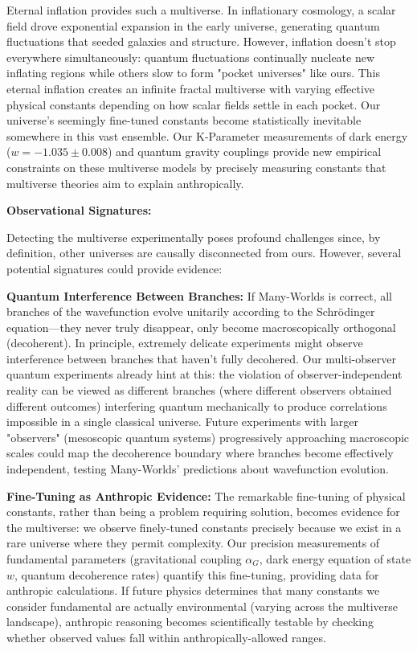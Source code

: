 \documentclass[11pt,a4paper,twoside]{article}
\begin{document}
Eternal inflation provides such a multiverse. In inflationary cosmology, a scalar field drove exponential expansion in the early universe, generating quantum fluctuations that seeded galaxies and structure. However, inflation doesn't stop everywhere simultaneously: quantum fluctuations continually nucleate new inflating regions while others slow to form "pocket universes" like ours. This eternal inflation creates an infinite fractal multiverse with varying effective physical constants depending on how scalar fields settle in each pocket. Our universe's seemingly fine-tuned constants become statistically inevitable somewhere in this vast ensemble. Our K-Parameter measurements of dark energy ($w = -1.035 \pm 0.008$) and quantum gravity couplings provide new empirical constraints on these multiverse models by precisely measuring constants that multiverse theories aim to explain anthropically.

\textbf{Observational Signatures:}

Detecting the multiverse experimentally poses profound challenges since, by definition, other universes are causally disconnected from ours. However, several potential signatures could provide evidence:

\textbf{Quantum Interference Between Branches:} If Many-Worlds is correct, all branches of the wavefunction evolve unitarily according to the Schrödinger equation—they never truly disappear, only become macroscopically orthogonal (decoherent). In principle, extremely delicate experiments might observe interference between branches that haven't fully decohered. Our multi-observer quantum experiments already hint at this: the violation of observer-independent reality can be viewed as different branches (where different observers obtained different outcomes) interfering quantum mechanically to produce correlations impossible in a single classical universe. Future experiments with larger "observers" (mesoscopic quantum systems) progressively approaching macroscopic scales could map the decoherence boundary where branches become effectively independent, testing Many-Worlds' predictions about wavefunction evolution.

\textbf{Fine-Tuning as Anthropic Evidence:} The remarkable fine-tuning of physical constants, rather than being a problem requiring solution, becomes evidence for the multiverse: we observe finely-tuned constants precisely because we exist in a rare universe where they permit complexity. Our precision measurements of fundamental parameters (gravitational coupling $\alpha_G$, dark energy equation of state $w$, quantum decoherence rates) quantify this fine-tuning, providing data for anthropic calculations. If future physics determines that many constants we consider fundamental are actually environmental (varying across the multiverse landscape), anthropic reasoning becomes scientifically testable by checking whether observed values fall within anthropically-allowed ranges.
\end{document}
